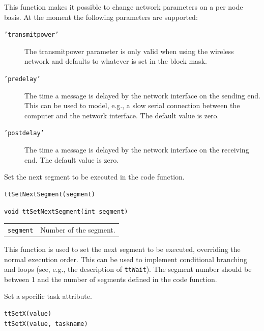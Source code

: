 \documentclass[final,twoside]{rapport}
\begin{document}
\descr This function makes it possible to change network parameters on
a per node basis. At the moment the following parameters are
supported: 
\begin{description}
\item[\tt 'transmitpower'] The transmitpower parameter is only valid when using the
wireless network and defaults to whatever is set in the block mask.
\item[\tt 'predelay'] The time a message is
delayed by the network interface on the sending end. This can be used
to model, e.g., a slow serial connection between the computer and the
network interface. The default value is zero.
\item[\tt 'postdelay'] The time a message is
delayed by the network interface on the receiving end.  The default
value is zero. 
\end{description}




\purpose
Set the next segment to be executed in the code function.

\Msyntax
\begin{verbatim}
ttSetNextSegment(segment)
\end{verbatim}

\Csyntax
\begin{verbatim}
void ttSetNextSegment(int segment)
\end{verbatim}

\args
\begin{tabularx}{\hsize}{l>{\raggedright\arraybackslash}X}
  {\tt segment} & Number of the segment. \\
\end{tabularx}

\descr This function is used to set the next segment to be executed,
overriding the normal execution order. This can be used to implement
conditional branching and loops (see, e.g., the description of
\texttt{ttWait}). The segment number should be between 1 and the
number of segments defined in the code function.



\purpose
Set a specific task attribute.

\Msyntax
\begin{verbatim}
ttSetX(value)
ttSetX(value, taskname)
\end{verbatim}
\end{document}
